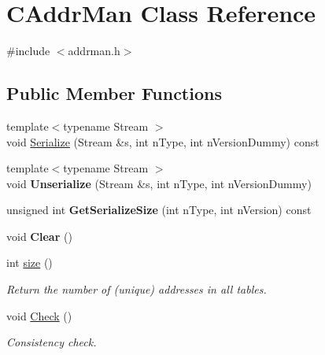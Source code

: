 \hypertarget{class_c_addr_man}{}\section{C\+Addr\+Man Class Reference}
\label{class_c_addr_man}


{\ttfamily \#include $<$addrman.\+h$>$}

\subsection*{Public Member Functions}
\begin{DoxyCompactItemize}
\item 
{\footnotesize template$<$typename Stream $>$ }\\void \mbox{\hyperlink{class_c_addr_man_a08668d8cf435750a80316b4708bbc9eb}{Serialize}} (Stream \&s, int n\+Type, int n\+Version\+Dummy) const
\item 
\mbox{\label{class_c_addr_man_a68eaf1797ecb8bff380aa7f9fc452e14}} 
{\footnotesize template$<$typename Stream $>$ }\\void {\bfseries Unserialize} (Stream \&s, int n\+Type, int n\+Version\+Dummy)
\item 
\mbox{\label{class_c_addr_man_a958c50de16b0d7fa068cce22a4cd8cb9}} 
unsigned int {\bfseries Get\+Serialize\+Size} (int n\+Type, int n\+Version) const
\item 
\mbox{\label{class_c_addr_man_a53c27520b7f8c6fa817c2fa869dd4e25}} 
void {\bfseries Clear} ()
\item 
\mbox{\label{class_c_addr_man_a15b8e72f55344b6fbd1bc1bda3cdc5bc}} 
int \mbox{\hyperlink{class_c_addr_man_a15b8e72f55344b6fbd1bc1bda3cdc5bc}{size}} ()
\begin{DoxyCompactList}\small\item\em Return the number of (unique) addresses in all tables. \end{DoxyCompactList}\item 
\mbox{\label{class_c_addr_man_a0c2677ae50ce0d680f0105b285d1f5d0}} 
void \mbox{\hyperlink{class_c_addr_man_a0c2677ae50ce0d680f0105b285d1f5d0}{Check}} ()
\begin{DoxyCompactList}\small\item\em Consistency check. \end{DoxyCompactList}\item 

\end{DoxyCompactItemize}
